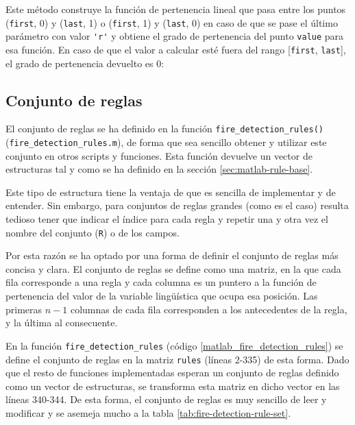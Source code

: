Este método construye la función de pertenencia lineal que pasa entre los puntos (\lstinline|first|, 0) y (\lstinline|last|, 1) o (\lstinline|first|, 1) y (\lstinline|last|, 0) en caso de que se pase el último parámetro con valor \lstinline|'r'| y obtiene el grado de pertenencia del punto \lstinline|value| para esa función. En caso de que el valor a calcular esté fuera del rango [\lstinline|first|, \lstinline|last|], el grado de pertenencia devuelto es 0:



\subsection{Conjunto de reglas}

El conjunto de reglas se ha definido en la función \lstinline|fire_detection_rules()| (\lstinline|fire_detection_rules.m|), de forma que sea sencillo obtener y utilizar este conjunto en otros scripts y funciones. Esta función devuelve un vector de estructuras tal y como se ha definido en la sección \ref{sec:matlab-rule-base}.

Este tipo de estructura tiene la ventaja de que es sencilla de implementar y de entender. Sin embargo, para conjuntos de reglas grandes (como es el caso) resulta tedioso tener que indicar el índice para cada regla y repetir una y otra vez el nombre del conjunto (\lstinline|R|) o de los campos. 

Por esta razón se ha optado por una forma de definir el conjunto de reglas más concisa y clara. El conjunto de reglas se define como una matriz, en la que cada fila corresponde a una regla y cada columna es un puntero a la función de pertenencia del valor de la variable lingüística que ocupa esa posición. Las primeras $n-1$ columnas de cada fila corresponden a los antecedentes de la regla, y la última al consecuente.

En la función  \lstinline|fire_detection_rules| (código \ref{matlab_fire_detection_rules}) se define el conjunto de reglas en la matriz \lstinline|rules| (líneas 2-335) de esta forma. Dado que el resto de funciones implementadas esperan un conjunto de reglas definido como un vector de estructuras, se transforma esta matriz en dicho vector en las líneas 340-344. De esta forma, el conjunto de reglas es muy sencillo de leer y modificar y se asemeja mucho a la tabla \ref{tab:fire-detection-rule-set}.

